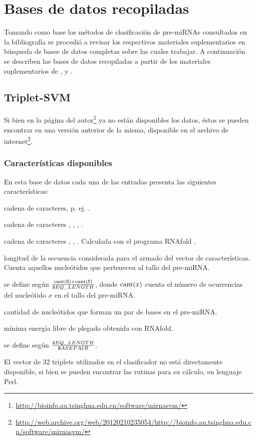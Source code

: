 \documentclass[12pt,bibliography=oldstyle,DIV=12,parskip=half-]{scrreprt}
\begin{document}
\section{Bases de datos recopiladas}
%
Tomando como base los métodos de clasificación de pre-miRNAs
consultados en la bibliografía se procedió a revisar los respectivos
materiales suplementarios en búsqueda de bases de datos completas
sobre las cuales trabajar.  A continuación se describen las bases de
datos recopiladas a partir de los materiales suplementarios de
\cite{xue}, \cite{ng} y \cite{batuwita}.
%
\subsection{Triplet-SVM \cite{xue}}
%
Si bien en la página del
autor\footnote{\url{http://bioinfo.au.tsinghua.edu.cn/software/mirnasvm/}}
ya no están disponibles los datos, éstos se pueden encontrar en una
versión anterior de la misma, disponible en el archivo de
internet\footnote{\url{http://web.archive.org/web/20120210235054/http://bioinfo.au.tsinghua.edu.cn/software/mirnasvm/}}.
%
\subsubsection{Características disponibles}
En esta base de datos cada una de las entradas presenta las siguientes
características:
\begin{description}
  [style=sameline,leftmargin=3cm,itemsep=6pt]
%
\item[identificador] cadena de caracteres, p. ej. .
%
\item[secuencia] cadena de caracteres , , ,
  .
%
\item[estructura secundaria] cadena de caracteres \mono{(}, ,
  \mono{)}. Calculada con el programa RNAfold \cite{vienna}.
%
\item[SEQ\_LENGTH] longitud de la secuencia considerada para el armado
  del vector de características. Cuenta aquellos nucleótidos que
  pertenecen al tallo del pre-miRNA.
%
\item[GC\_CONTENT] se define según
  $\frac{\textrm{cant}({\texttt G})+\textrm{cant}({\texttt C})}{{\texttt SEQ\_LENGTH}}$,
  donde $\textrm{cant}(x)$ cuenta el número de ocurrencias del nucleótido
  $x$ en el tallo del pre-miRNA.
%
\item[BASEPAIR] cantidad de nucleótidos
  que forman un par de bases en el pre-miRNA.
%
\item[FREE\_ENERGY] mínima energía libre de plegado
  obtenida con RNAfold.
%
\item[LEN\_BP\_RATIO] se define según
  $\frac{{\texttt SEQ\_LENGTH}}{{\texttt BASEPAIR}}$.
\end{description}
%
El vector de 32 triplets utilizados en el clasificador no está
directamente disponible, si bien se pueden encontrar las rutinas para su
cálculo, en lenguaje Perl.
%
\end{document}
